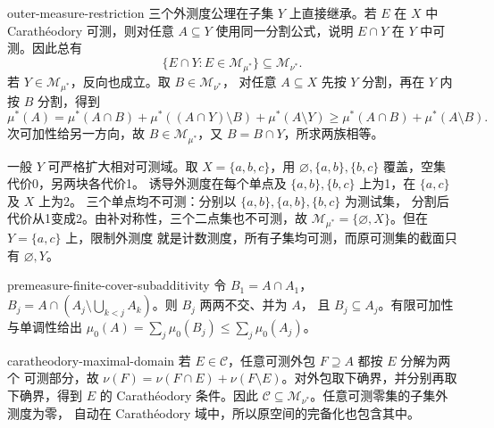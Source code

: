 \begin{solution}{outer-measure-restriction}
三个外测度公理在子集 $Y$ 上直接继承。若 $E$ 在 $X$ 中
Carathéodory 可测，则对任意 $A\subseteq Y$ 使用同一分割公式，说明
$E\cap Y$ 在 $Y$ 中可测。因此总有
\[
 \{E\cap Y:E\in\mathcal M_{\mu^*}\}\subseteq\mathcal M_{\nu^*}.
\]
若 $Y\in\mathcal M_{\mu^*}$，反向也成立。取 $B\in\mathcal M_{\nu^*}$，
对任意 $A\subseteq X$ 先按 $Y$ 分割，再在 $Y$ 内按 $B$ 分割，得到
\[
 \mu^*(A)=\mu^*(A\cap B)+\mu^*((A\cap Y)\setminus B)+\mu^*(A\setminus Y)
 \ge\mu^*(A\cap B)+\mu^*(A\setminus B).
\]
次可加性给另一方向，故 $B\in\mathcal M_{\mu^*}$，又 $B=B\cap Y$，所求两族相等。

一般 $Y$ 可严格扩大相对可测域。取 $X=\{a,b,c\}$，用
$\varnothing,\{a,b\},\{b,c\}$ 覆盖，空集代价0，另两块各代价1。
诱导外测度在每个单点及 $\{a,b\},\{b,c\}$ 上为1，在 $\{a,c\}$ 及 $X$ 上为2。
三个单点均不可测：分别以 $\{a,b\},\{a,b\},\{b,c\}$ 为测试集，
分割后代价从1变成2。由补对称性，三个二点集也不可测，故
$\mathcal M_{\mu^*}=\{\varnothing,X\}$。但在 $Y=\{a,c\}$ 上，限制外测度
就是计数测度，所有子集均可测，而原可测集的截面只有 $\varnothing,Y$。
\end{solution}

\begin{solution}{premeasure-finite-cover-subadditivity}
令 $B_1=A\cap A_1$，
$B_j=A\cap(A_j\setminus\bigcup_{k<j}A_k)$。则 $B_j$ 两两不交、并为 $A$，
且 $B_j\subseteq A_j$。有限可加性与单调性给出
$\mu_0(A)=\sum_j\mu_0(B_j)\le\sum_j\mu_0(A_j)$。
\end{solution}

\begin{solution}{caratheodory-maximal-domain}
若 $E\in\mathcal C$，任意可测外包 $F\supseteq A$ 都按 $E$ 分解为两个
可测部分，故
$\nu(F)=\nu(F\cap E)+\nu(F\setminus E)$。对外包取下确界，并分别再取
下确界，得到 $E$ 的 Carathéodory 条件。因此
$\mathcal C\subseteq\mathcal M_{\nu^*}$。任意可测零集的子集外测度为零，
自动在 Carathéodory 域中，所以原空间的完备化也包含其中。
\end{solution}
